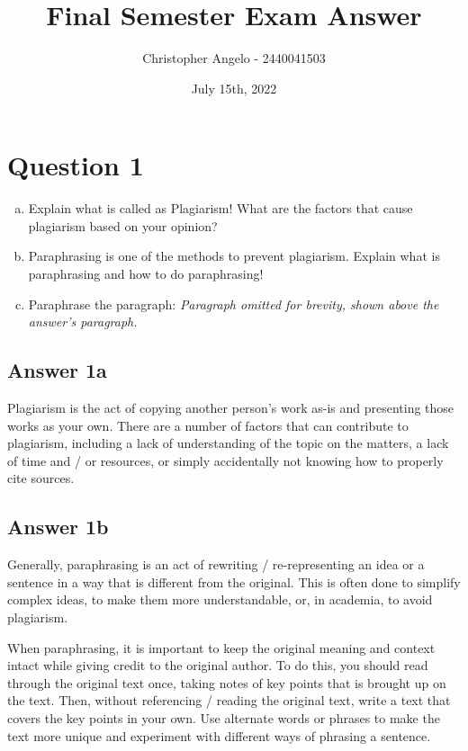 \documentclass[
  11pt, %
]{assignment}
\author{Christopher Angelo - 2440041503}
\institute{BINUS University\\ Global Class}
\date{July 15th, 2022}
\title{Final Semester Exam Answer}
\begin{document}
\maketitle



\section*{Question 1}

\begin{problem}
\begin{enumerate}[a.]
  \item Explain what is called as Plagiarism! What are the factors that cause plagiarism based on your opinion?
  \item Paraphrasing is one of the methods to prevent plagiarism. Explain what is paraphrasing and how to do paraphrasing!
  \item Paraphrase the paragraph:
        \textit{Paragraph omitted for brevity, shown above the answer's paragraph.}
\end{enumerate}
\end{problem}

\subsection*{Answer 1a}

Plagiarism is the act of copying another person's work as-is and presenting those works as your own. There are a number of factors that can contribute to plagiarism, including a lack of understanding of the topic on the matters, a lack of time and / or resources, or simply accidentally not knowing how to properly cite sources.

\subsection*{Answer 1b}

Generally, paraphrasing is an act of rewriting / re-representing an idea or a sentence in a way that is different from the original. This is often done to simplify complex ideas, to make them more understandable, or, in academia, to avoid plagiarism.

When paraphrasing, it is important to keep the original meaning and context intact while giving credit to the original author. To do this, you should read through the original text once, taking notes of key points that is brought up on the text. Then, without referencing / reading the original text, write a text that covers the key points in your own. Use alternate words or phrases to make the text more unique and experiment with different ways of phrasing a sentence.
\end{document}
